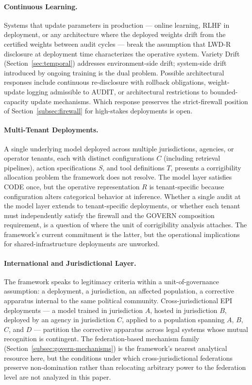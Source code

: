 \documentclass{article}
\theoremstyle{definition}
\begin{document}
\paragraph{Continuous Learning.} Systems that update parameters in production --- online learning, RLHF in deployment, or any architecture where the deployed weights drift from the certified weights between audit cycles --- break the assumption that LWD-R disclosure at deployment time characterizes the operative system. Variety Drift (Section~\ref{sec:temporal}) addresses environment-side drift; system-side drift introduced by ongoing training is the dual problem. Possible architectural responses include continuous re-disclosure with rollback obligations, weight-update logging admissible to AUDIT, or architectural restrictions to bounded-capacity update mechanisms. Which response preserves the strict-firewall position of Section~\ref{subsec:firewall} for high-stakes deployments is open.

\paragraph{Multi-Tenant Deployments.} A single underlying model deployed across multiple jurisdictions, agencies, or operator tenants, each with distinct configurations $C$ (including retrieval pipelines), action specifications $S$, and tool definitions $T$, presents a corrigibility allocation problem the framework does not resolve. The model layer satisfies CODE once, but the operative representation $R$ is tenant-specific because configuration alters categorical behavior at inference. Whether a single audit at the model layer extends to tenant-specific deployments, or whether each tenant must independently satisfy the firewall and the GOVERN composition requirement, is a question of where the unit of corrigibility analysis attaches. The framework's current commitment is the latter, but the operational implications for shared-infrastructure deployments are unworked.

\paragraph{International and Jurisdictional Layer.} The framework speaks to legitimacy criteria within a unit-of-governance assumption: a deployment, a jurisdiction, an affected population, a corrective apparatus internal to the same political community. Cross-jurisdictional EPI deployments --- a model trained in jurisdiction $A$, hosted in jurisdiction $B$, deployed by an agency in jurisdiction $C$, applied to a population spanning $A$, $B$, $C$, and $D$ --- partition the corrective apparatus across legal systems whose mutual recognition is contingent. The federation-based mechanism family (Section~\ref{subsec:govern-mechanisms}) is the framework's nearest analytical resource here, but the conditions under which cross-jurisdictional federations preserve non-domination rather than relocating arbitrary power to the federation level are not analyzed in this paper.
\end{document}
